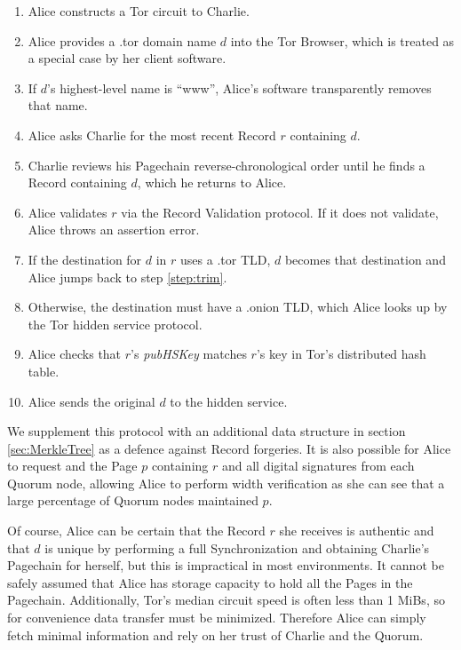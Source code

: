 \begin{enumerate}
	\item Alice constructs a Tor circuit to Charlie.
	\item Alice provides a .tor domain name $ d $ into the Tor Browser, which is treated as a special case by her client software.
	\item \label{step:trim} If $ d $'s highest-level name is ``www'', Alice's software transparently removes that name.
	\item \label{step:level} Alice asks Charlie for the most recent Record $ r $ containing $ d $.
	\item Charlie reviews his Pagechain reverse-chronological order until he finds a Record containing $ d $, which he returns to Alice.
	\item Alice validates $ r $ via the Record Validation protocol. If it does not validate, Alice throws an assertion error.
	\item If the destination for $ d $ in $ r $ uses a .tor TLD, $ d $ becomes that destination and Alice jumps back to step \ref{step:trim}.
	\item Otherwise, the destination must have a .onion TLD, which Alice looks up by the Tor hidden service protocol.
	\item Alice checks that $ r $'s \emph{pubHSKey} matches $ r $'s key in Tor's distributed hash table.
	\item Alice sends the original $ d $ to the hidden service.
\end{enumerate}

We supplement this protocol with an additional data structure in section \ref{sec:MerkleTree} as a defence against Record forgeries. It is also possible for Alice to request and the Page $ p $ containing $ r $ and all digital signatures from each Quorum node, allowing Alice to perform width verification as she can see that a large percentage of Quorum nodes maintained $ p $.

Of course, Alice can be certain that the Record $ r $ she receives is authentic and that $ d $ is unique by performing a full Synchronization and obtaining Charlie's Pagechain for herself, but this is impractical in most environments. It cannot be safely assumed that Alice has storage capacity to hold all the Pages in the Pagechain. Additionally, Tor's median circuit speed is often less than 1 MiBs\cite{TorMetrics}, so for convenience data transfer must be minimized. Therefore Alice can simply fetch minimal information and rely on her trust of Charlie and the Quorum.

